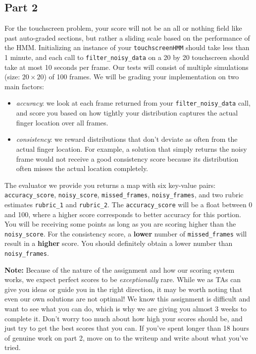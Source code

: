 \documentclass{article}
\begin{document}
\subsection{Part 2}
\label{subsec:part2grading}
For the touchscreen problem, your score will not be an all or nothing field like past auto-graded sections, but rather a sliding scale based on the performance of the HMM. Initializing an instance of your \texttt{touchscreenHMM} should take less than 1 minute, and each call to \texttt{filter\_noisy\_data} on a 20 by 20 touchscreen should take at most 10 seconds per frame. Our tests will consist of multiple simulations (size: $20 \times 20$) of 100 frames. We will be grading your implementation on two main factors:
\begin{itemize}
    \item \textit{accuracy}: we look at each frame returned from your \texttt{filter\_noisy\_data} call, and score you based on how tightly your distribution captures the actual finger location over all frames.
    \item \textit{consistency}: we reward distributions that don't deviate as often from the actual finger location. For example, a solution that simply returns the noisy frame would not receive a good consistency score because its distribution often misses the actual location completely.
\end{itemize}
The evaluator we provide you returns a map with six key-value pairs: \texttt{accuracy\_score}, \texttt{noisy\_score}, \texttt{missed\_frames}, \texttt{noisy\_frames}, and two rubric estimates \texttt{rubric\_1} and \texttt{rubric\_2}. The \texttt{accuracy\_score} will be a float between 0 and 100, where a higher score corresponds to better accuracy for this portion. You will be receiving some points as long as you are scoring higher than the \texttt{noisy\_score}. For the consistency score, a \textbf{lower} number of \texttt{missed\_frames} will result in a \textbf{higher} score. You should definitely obtain a lower number than \texttt{noisy\_frames}.

\textbf{Note:} Because of the nature of the assignment and how our scoring system works, we expect perfect scores to be \textit{exceptionally} rare. While we as TAs can give you ideas or guide you in the right direction, it may be worth noting that even our own solutions are not optimal! We know this assignment is difficult and want to see what you can do, which is why we are giving you almost 3 weeks to complete it. Don't worry too much about how high your scores should be, and just try to get the best scores that you can. If you've spent longer than 18 hours of genuine work on part 2, move on to the writeup and write about what you've tried.
\end{document}
